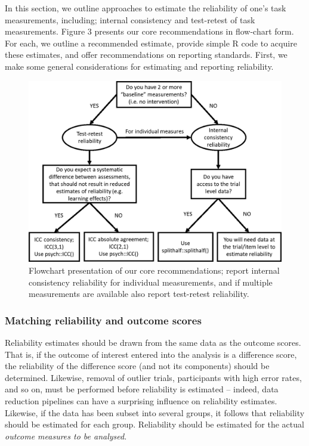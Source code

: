 \documentclass[english,,man,floatsintext]{apa6}
\begin{document}
In this section, we outline approaches to estimate the reliability of one's task measurements, including; internal consistency and test-retest of task measurements. Figure 3 presents our core recommendations in flow-chart form. For each, we outline a recommended estimate, provide simple R code to acquire these estimates, and offer recommendations on reporting standards. First, we make some general considerations for estimating and reporting reliability.

\begin{figure}[h]

{\centering \includegraphics[width=0.8\linewidth]{fig3} 

}

\caption{Flowchart presentation of our core recommendations; report internal consistency reliability for individual measurements, and if multiple measurements are available also report test-retest reliability.}\label{fig:figthree}
\end{figure}

\hypertarget{matching-reliability-and-outcome-scores}{%
\subsubsection{Matching reliability and outcome scores}\label{matching-reliability-and-outcome-scores}}

Reliability estimates should be drawn from the same data as the outcome scores. That is, if the outcome of interest entered into the analysis is a difference score, the reliability of the difference score (and not its components) should be determined. Likewise, removal of outlier trials, participants with high error rates, and so on, must be performed before reliability is estimated -- indeed, data reduction pipelines can have a surprising influence on reliability estimates. Likewise, if the data has been subset into several groups, it follows that reliability should be estimated for each group. Reliability should be estimated for the actual \emph{outcome measures to be analysed}.
\end{document}
